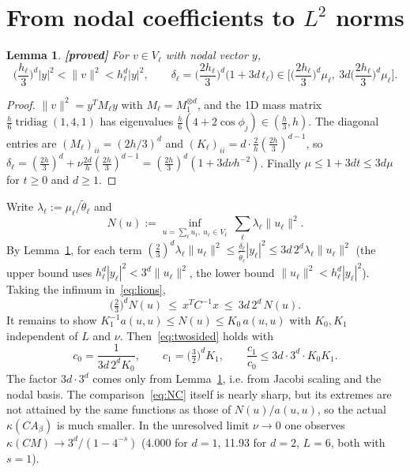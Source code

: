 \documentclass[11pt,a4paper]{article}
\newtheorem{lemma}[theorem]{Lemma}
\theoremstyle{remark}
\begin{document}
\section{From nodal coefficients to $L^2$ norms}

\begin{lemma}\label{lem:nodal}\textbf{[proved]} For $v\in V_\ell$ with nodal vector $y$,
\[
\Big(\frac{h_\ell}3\Big)^d|y|^2<\|v\|^2<h_\ell^d|y|^2,\qquad
\delta_\ell=\Big(\frac{2h_\ell}3\Big)^d\big(1+3d\,t_\ell\big)\in\Big[\Big(\frac{2h_\ell}{3}\Big)^d\mu_\ell,\ 3d\Big(\frac{2h_\ell}{3}\Big)^d\mu_\ell\Big].
\]
\end{lemma}
\begin{proof}
$\|v\|^2=y^TM_\ell y$ with $M_\ell=M_1^{\otimes d}$, and the 1D mass matrix
$\frac{h}6\operatorname{tridiag}(1,4,1)$ has eigenvalues $\frac h6(4+2\cos\phi_j)\in(\frac h3,h)$. The
diagonal entries are $(M_\ell)_{ii}=(2h/3)^d$ and
$(K_\ell)_{ii}=d\cdot\frac2h(\frac{2h}3)^{d-1}$, so
$\delta_\ell=(\frac{2h}3)^d+\nu\frac{2d}h(\frac{2h}3)^{d-1}=(\frac{2h}3)^d(1+3d\nu h^{-2})$. Finally
$\mu\le1+3dt\le3d\mu$ for $t\ge0$ and $d\ge1$.
\end{proof}

Write $\lambda_\ell:=\mu_\ell/\tilde\theta_\ell$ and
\[
N(u):=\inf_{u=\sum_\ell u_\ell,\ u_\ell\in V_\ell}\ \sum_\ell\lambda_\ell\|u_\ell\|^2 .
\]
By Lemma~\ref{lem:nodal}, for each term
$(\frac23)^d\lambda_\ell\|u_\ell\|^2\le\frac{\delta_\ell}{\tilde\theta_\ell}|y_\ell|^2\le3d\,2^d\lambda_\ell\|u_\ell\|^2$
(the upper bound uses $h_\ell^d|y_\ell|^2<3^d\|u_\ell\|^2$, the lower bound $\|u_\ell\|^2<h_\ell^d|y_\ell|^2$).
Taking the infimum in~\eqref{eq:lions},
\begin{equation}\label{eq:NC}
\big(\tfrac23\big)^dN(u)\ \le\ x^TC^{-1}x\ \le\ 3d\,2^d\,N(u).
\end{equation}
It remains to show $K_1^{-1}a(u,u)\le N(u)\le K_0\,a(u,u)$ with $K_0,K_1$ independent of
$L$ and $\nu$. Then~\eqref{eq:twosided} holds with
\[
c_0=\frac1{3d\,2^dK_0},\qquad c_1=\big(\tfrac32\big)^dK_1,\qquad
\frac{c_1}{c_0}\le3d\cdot3^d\cdot K_0K_1 .
\]
The factor $3d\cdot3^d$ comes only from Lemma~\ref{lem:nodal}, i.e. from Jacobi
scaling and the nodal basis. The comparison~\eqref{eq:NC} itself is nearly
sharp, but its extremes are not attained by the same functions as those of
$N(u)/a(u,u)$, so the actual $\kappa(CA_\beta)$ is much smaller. In the
unresolved limit $\nu\to0$ one observes $\kappa(CM)\to3^d/(1-4^{-s})$ (4.000 for
$d=1$, 11.93 for $d=2$, $L=6$, both with $s=1$).
\end{document}

